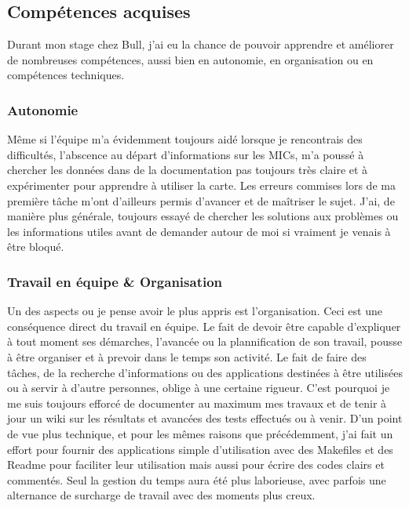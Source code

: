 \documentclass[11pt]{article}
\begin{document}
		\subsection{Compétences acquises}
		Durant mon stage chez Bull, j'ai eu la chance de pouvoir apprendre et améliorer de nombreuses compétences, aussi bien 
		en autonomie, en organisation ou en compétences techniques.
			\subsubsection{Autonomie}
			Même si l'équipe m'a évidemment toujours aidé lorsque je rencontrais des difficultés, l'abscence au départ 
			d'informations sur les MICs, m'a poussé à chercher les données dans de la documentation pas toujours très claire et à 
			expérimenter pour apprendre à utiliser la carte. Les erreurs commises lors de ma première tâche m'ont d'ailleurs permis d'avancer 
			et de maîtriser le sujet. J'ai, de manière plus générale, toujours essayé de chercher les solutions aux problèmes ou les 
			informations utiles avant de demander autour de moi si vraiment je venais à être bloqué.
			\subsubsection{Travail en équipe \& Organisation}
			Un des aspects ou je pense avoir le plus appris est l'organisation. Ceci est une conséquence direct du travail 
			en équipe. Le fait de devoir être capable d'expliquer à tout moment ses démarches, l'avancée ou la plannification 
			de son travail, pousse à être organiser et à prevoir dans le temps son activité. Le fait de faire des tâches, de la 
			recherche d'informations ou des applications destinées à être utilisées ou à servir à d'autre personnes, oblige à une 
			certaine rigueur. C'est pourquoi je me suis toujours efforcé de documenter au maximum mes travaux et de tenir à jour 
			un wiki sur les résultats et avancées des tests effectués ou à venir. \newline
			D'un point de vue plus technique, et pour les mêmes raisons que précédemment, j'ai fait un effort pour fournir 
			des applications simple d'utilisation avec des Makefiles et des Readme pour faciliter leur utilisation mais aussi 
			pour écrire des codes clairs et commentés. \newline
			Seul la gestion du temps aura été plus laborieuse, avec parfois une alternance de surcharge de travail avec des moments 
			plus creux.
\end{document}
